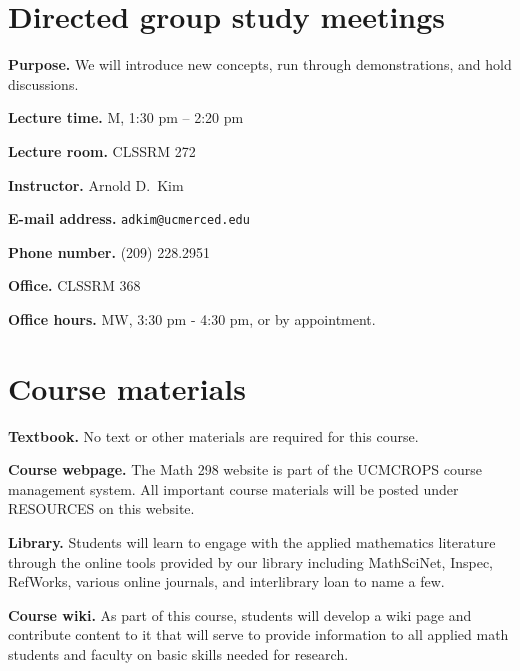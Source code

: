 \documentclass{article}
\begin{document}
\section*{Directed group study meetings}

\begin{description}

\item {\bf Purpose.} We will introduce new concepts, run through
  demonstrations, and hold discussions.

\item {\bf Lecture time.} M, 1:30 pm -- 2:20 pm

\item {\bf Lecture room.} CLSSRM 272

\item {\bf Instructor.} Arnold D.~Kim

  \begin{description}

  \item {\bf E-mail address.} {\tt adkim@ucmerced.edu}

  \item {\bf Phone number.} (209) 228.2951

  \item {\bf Office.} CLSSRM 368

  \item {\bf Office hours.} MW, 3:30 pm - 4:30 pm, or by appointment.

  \end{description}

\end{description}

\section*{Course materials}

\begin{description}

\item {\bf Textbook.} No text or other materials are required for this
  course.

\item {\bf Course webpage.} The Math 298 website is part of the
  UCMCROPS course management system. All important course materials
  will be posted under RESOURCES on this website.

\item {\bf Library.} Students will learn to engage with the applied
  mathematics literature through the online tools provided by our
  library including MathSciNet, Inspec, RefWorks, various online
  journals, and interlibrary loan to name a few.

\item {\bf Course wiki.} As part of this course, students will develop
  a wiki page and contribute content to it that will serve to provide
  information to all applied math students and faculty on basic skills
  needed for research.

\end{description}
\end{document}
